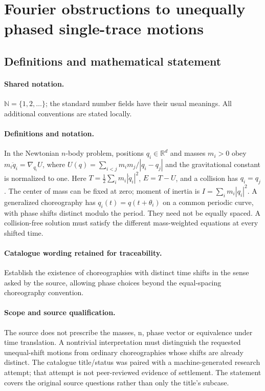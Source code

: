 \documentclass[11pt]{article}
\begin{document}
\section{Fourier obstructions to unequally phased single-trace motions}\label{statement}

\subsection{Definitions and mathematical statement}

\paragraph{Shared notation.}$\mathbb N=\{1,2,\ldots\}$; the standard number fields have their usual meanings. All additional conventions are stated locally.


\paragraph{Definitions and notation.}In the Newtonian $n$-body problem, positions $q_i\in\mathbb R^d$ and masses $m_i>0$ obey $m_i\ddot q_i=\nabla_{q_i}U$, where $U(q)=\sum_{i<j}m_im_j/|q_i-q_j|$ and the gravitational constant is normalized to one. Here $T=\tfrac12\sum_i m_i|\dot q_i|^2$, $E=T-U$, and a collision has $q_i=q_j$. The center of mass can be fixed at zero; moment of inertia is $I=\sum_i m_i|q_i|^2$. A generalized choreography has $q_i(t)=q(t+\theta_i)$ on a common periodic curve, with phase shifts distinct modulo the period. They need not be equally spaced. A collision-free solution must satisfy the different mass-weighted equations at every shifted time.

\paragraph{Catalogue wording retained for traceability.}
Establish the existence of choreographies with distinct time shifts in the sense asked by the source, allowing phase choices beyond the equal-spacing choreography convention.
\paragraph{Scope and source qualification.}The source does not prescribe the masses, n, phase vector or equivalence under time translation. A nontrivial interpretation must distinguish the requested unequal-shift motions from ordinary choreographies whose shifts are already distinct. The catalogue title/status was paired with a machine-generated research attempt; that attempt is not peer-reviewed evidence of settlement. The statement covers the original source questions rather than only the title’s subcase.
\end{document}
